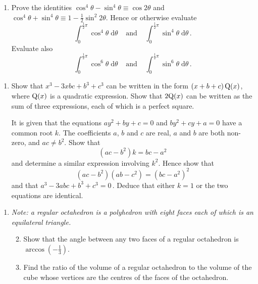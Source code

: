 \documentclass[a4, 11pt]{report}
\newlength{\qspace}
\newcounter{qnumber}
\newenvironment{question}%
 {\vspace{\qspace}
  \begin{enumerate}[\bfseries 1\quad][10]%
    \setcounter{enumi}{\value{qnumber}}%
    \item%
 }
{
  \end{enumerate}
  \filbreak
  \stepcounter{qnumber}
 }
\newenvironment{questionparts}[1][1]%
 {
  \begin{enumerate}[\bfseries (i)]%
    \setcounter{enumii}{#1}
    \addtocounter{enumii}{-1}
    \setlength{\itemsep}{5mm}
    \setlength{\parskip}{8pt}
 }
 {
  \end{enumerate}
 }
\def\d{{\mathrm d}}
\begin{document}
\begin{question}
Prove the identities
$\cos^4\theta -\sin^4\theta \equiv \cos 2\theta$ and
 $\cos^4 \theta + \sin^4 \theta \equiv 1 - {\frac12}
\sin^2 2 \theta$. Hence or otherwise evaluate
\[
\int_0^{\frac{1}{2}\pi} \cos^4 \theta \; \d \theta \;\;\;\;
\mbox{and}\;\;\;\; \int_0^{\frac{1}{2}\pi} \sin^4 \theta \; \d \theta \,.
\]
Evaluate also
\[
\int_0^{\frac{1}{2}\pi} \cos^6 \theta \; \d \theta \;\;\;\;
\mbox{and}\;\;\;\; \int_0^{\frac{1}{2}\pi} \sin^6 \theta \; \d \theta \,.
\]
\end{question}

\begin{question}
Show that 
$x^3-3xbc + b^3 + c^3$ can be written in the form
$\left( x+ b+ c \right) {\rm Q}( x)$,
where ${\rm Q}( x )$ is a quadratic expression.
Show that $2{\rm Q }( x )$ can be written
as the sum of three expressions, each of which is a perfect square.


It is given that the equations
$ay^2 + by + c =0$ and $by^2 + cy + a = 0$
have a common root $k$. The coefficients $a$, $b$ and $c$ are
real, $a$ and $b$ are both non-zero, and $ac \neq b^2$. Show that
\[
\left( ac - b^2 \right) k = bc - a^2
\]
and determine a similar expression involving $k^2$. Hence show that
\[
\left( ac - b^2 \right) \left(ab-c^2 \right) = \left( bc - a^2 \right)^2
\]
and that $ a^3 -3abc + b^3 +c^3 = 0\,$. Deduce that either $k=1$
or  the two equations are identical.
\end{question}

\begin{question}
{\it Note: a regular octahedron is a polyhedron with eight faces
each of which is an equilateral \hbox{triangle}.}
\begin{questionparts}
\item
Show that the angle between any two faces of a regular
octahedron is $\arccos \left( -{\frac1  3} \right)$.

\item
Find the  ratio of the volume of a regular octahedron to the volume of 
the cube whose vertices are the centres  of the faces of the 
octahedron.

\end{questionparts}
	\end{question}
	
\end{document}
